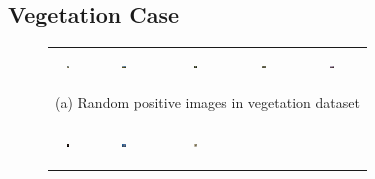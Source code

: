 \subsection{Vegetation Case}


\begin{figure}[th!]
{\tiny{
\begin{center}
\begin{tabular}{@{}c@{\,\,\,}c@{\,\,\,}c@{\,\,\,}c@{\,\,\,}c@{\,\,\,}}
\includegraphics[width=0.06\textwidth, height=0.35in]{imggrid/datasetposi/6.jpg} &
\includegraphics[width=0.06\textwidth, height=0.35in]{imggrid/datasetposi/7.jpg} &
\includegraphics[width=0.06\textwidth, height=0.35in]{imggrid/datasetposi/8.jpg} &
\includegraphics[width=0.06\textwidth, height=0.35in]{imggrid/datasetposi/9.jpg} &
\includegraphics[width=0.06\textwidth, height=0.35in]{imggrid/datasetposi/10.jpg} \\
\multicolumn{5}{c}{(a) Random positive images in vegetation dataset} \\ 
\\[1pt]
\hline
\\[1pt]
\includegraphics[width=0.06\textwidth, height=0.35in]{imggrid/datasetnega/6.jpg} &
\includegraphics[width=0.06\textwidth, height=0.35in]{imggrid/datasetnega/7.jpg} &
\includegraphics[width=0.06\textwidth, height=0.35in]{imggrid/datasetnega/8.jpg} &

\end{tabular}
\end{center}}}
\end{figure}

